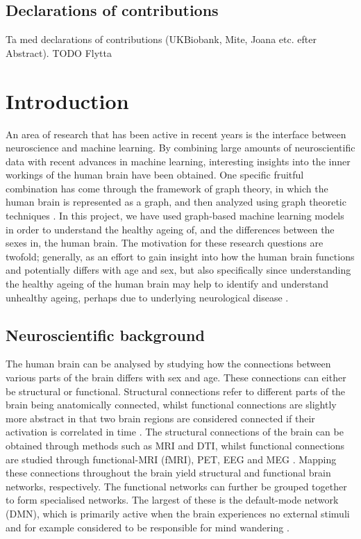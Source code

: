 \section{Declarations of contributions}
Ta med declarations of contributions (UKBiobank, Mite, Joana etc. efter Abstract).
TODO Flytta

\chapter{Introduction}




An area of research that has been active in recent years is the interface between neuroscience and machine learning. By combining large amounts of neuroscientific data with recent advances in machine learning, interesting insights into the inner workings of the human brain have been obtained. One specific fruitful combination has come through the framework of graph theory, in which the human brain is represented as a graph, and then analyzed using graph theoretic techniques \cite{chan}. In this project, we have used graph-based machine learning models in order to understand the healthy ageing of, and the differences between the sexes in, the human brain. The motivation for these research questions are twofold; generally, as an effort to gain insight into how the human brain functions and potentially differs with age and sex, but also specifically since understanding the healthy ageing of the human brain may help to identify and understand unhealthy ageing, perhaps due to underlying neurological disease \cite{kaufmann}. 


\section{Neuroscientific background}

The human brain can be analysed by studying how the connections between various parts of the brain differs with sex and age. These connections can either be structural or functional. Structural connections refer to different parts of the brain being anatomically connected, whilst functional connections are slightly more abstract in that two brain regions are considered connected if their activation is correlated in time \cite{sporns}. The structural connections of the brain can be obtained through methods such as MRI and DTI, whilst functional connections are studied through functional-MRI (fMRI), PET, EEG and MEG \cite{hirsch}. Mapping these connections throughout the brain yield structural and functional brain networks, respectively. The functional networks can further be grouped together to form specialised networks. The largest of these is the default-mode network (DMN), which is primarily active when the brain experiences no external stimuli and for example considered to be responsible for mind wandering \cite{alves_dmn}.

